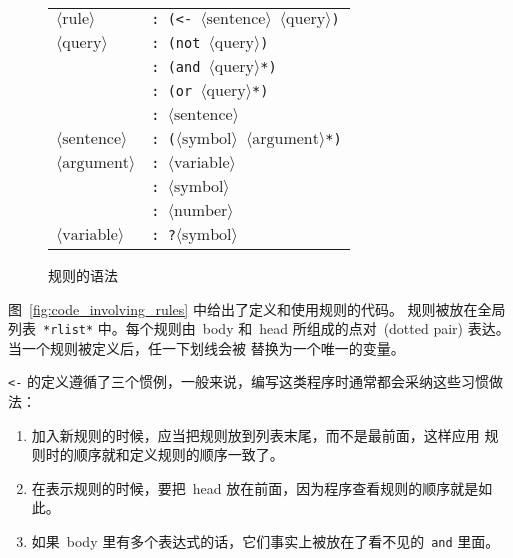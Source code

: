 \begin{figure}
  \begin{tabular}{ll}
    $\langle\mathrm{rule}\rangle$     & \texttt{: (<- $\langle\mathrm{sentence}\rangle$ $\langle\mathrm{query}\rangle$)} \\
    $\langle\mathrm{query}\rangle$    & \texttt{: (not $\langle\mathrm{query}\rangle$)} \\
                                      & \texttt{: (and $\langle\mathrm{query}\rangle$*)} \\
                                      & \texttt{: (or $\langle\mathrm{query}\rangle$*)} \\
                                      & \texttt{: $\langle\mathrm{sentence}\rangle$} \\
    $\langle\mathrm{sentence}\rangle$ & \texttt{: ($\langle\mathrm{symbol}\rangle$ $\langle\mathrm{argument}\rangle$*)} \\
    $\langle\mathrm{argument}\rangle$ & \texttt{: $\langle\mathrm{variable}\rangle$} \\
                                      & \texttt{: $\langle\mathrm{symbol}\rangle$} \\
                                      & \texttt{: $\langle\mathrm{number}\rangle$} \\
    $\langle\mathrm{variable}\rangle$ & \texttt{: ?$\langle\mathrm{symbol}\rangle$}
  \end{tabular}
  \caption{规则的语法}
  \label{fig:syntax_of_rules}
\end{figure}

图~\ref{fig:code_involving_rules} 中给出了定义和使用规则的代码。
规则被放在全局列表~\verb|*rlist*| 中。每个规则由~body
和~head 所组成的点对~(dotted pair) 表达。当一个规则被定义后，任一下划线会被
替换为一个唯一的变量。

\verb|<-| 的定义遵循了三个惯例，一般来说，编写这类程序时通常都会采纳这些习惯做法：

\begin{enumerate}
\item 加入新规则的时候，应当把规则放到列表末尾，而不是最前面，这样应用
  规则时的顺序就和定义规则的顺序一致了。
\item 在表示规则的时候，要把~head 放在前面，因为程序查看规则的顺序就是如此。
\item 如果~body 里有多个表达式的话，它们事实上被放在了看不见的~\verb|and| 里面。
\end{enumerate}

